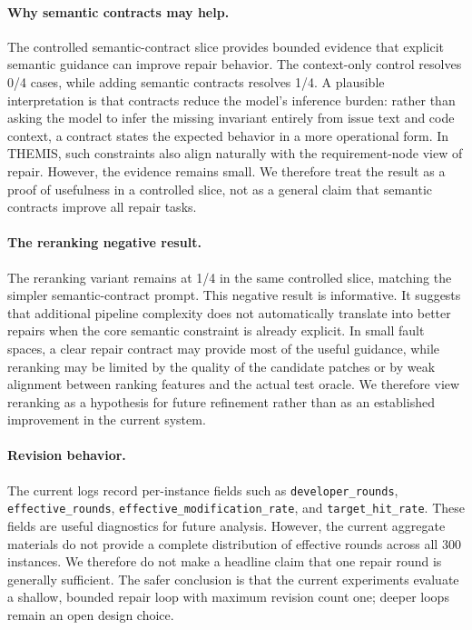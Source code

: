 \documentclass[11pt]{article}
\begin{document}
\paragraph{Why semantic contracts may help.}
The controlled semantic-contract slice provides bounded evidence that explicit semantic guidance can improve repair behavior.  The context-only control resolves 0/4 cases, while adding semantic contracts resolves 1/4.  A plausible interpretation is that contracts reduce the model's inference burden: rather than asking the model to infer the missing invariant entirely from issue text and code context, a contract states the expected behavior in a more operational form.  In THEMIS, such constraints also align naturally with the requirement-node view of repair.  However, the evidence remains small.  We therefore treat the result as a proof of usefulness in a controlled slice, not as a general claim that semantic contracts improve all repair tasks.

\paragraph{The reranking negative result.}
The reranking variant remains at 1/4 in the same controlled slice, matching the simpler semantic-contract prompt.  This negative result is informative.  It suggests that additional pipeline complexity does not automatically translate into better repairs when the core semantic constraint is already explicit.  In small fault spaces, a clear repair contract may provide most of the useful guidance, while reranking may be limited by the quality of the candidate patches or by weak alignment between ranking features and the actual test oracle.  We therefore view reranking as a hypothesis for future refinement rather than as an established improvement in the current system.

\paragraph{Revision behavior.}
The current logs record per-instance fields such as \texttt{developer\_rounds}, \texttt{effective\_rounds}, \texttt{effective\_modification\_rate}, and \texttt{target\_hit\_rate}.  These fields are useful diagnostics for future analysis.  However, the current aggregate materials do not provide a complete distribution of effective rounds across all 300 instances.  We therefore do not make a headline claim that one repair round is generally sufficient.  The safer conclusion is that the current experiments evaluate a shallow, bounded repair loop with maximum revision count one; deeper loops remain an open design choice.
\end{document}
